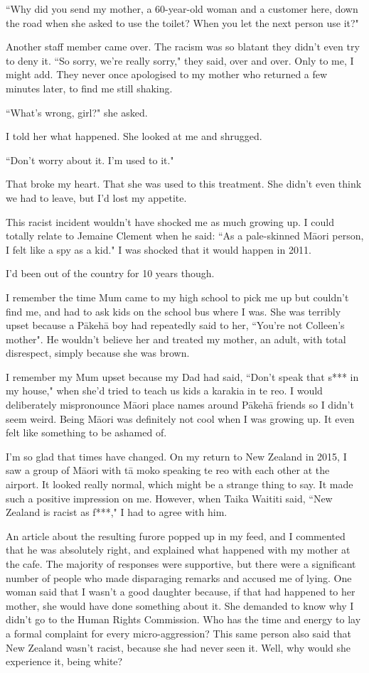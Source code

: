 \documentclass[10pt,a4paper]{article}
\newcommand{\qm}[1]{``#1"}
\begin{document}
\qm{Why did you send my mother, a 60-year-old woman and a customer here, down the road when she asked to use the toilet? When you let the next person use it?}

Another staff member came over. The racism was so blatant they didn't even try to deny it. \qm{So sorry, we're really sorry,} they said, over and over. Only to me, I might add. They never once apologised to my mother who returned a few minutes later, to find me still shaking.

\qm{What's wrong, girl?} she asked.

I told her what happened. She looked at me and shrugged.

\qm{Don't worry about it. I'm used to it.}

That broke my heart. That she was used to this treatment. She didn't even think we had to leave, but I'd lost my appetite.

This racist incident wouldn't have shocked me as much growing up. I could totally relate to Jemaine Clement when he said: \qm{As a pale-skinned Māori person, I felt like a spy as a kid.} I was shocked that it would happen in 2011.

I'd been out of the country for 10 years though.

I remember the time Mum came to my high school to pick me up but couldn't find me, and had to ask kids on the school bus where I was. She was terribly upset because a Pākehā boy had repeatedly said to her, \qm{You're not Colleen's mother}. He wouldn't believe her and treated my mother, an adult, with total disrespect, simply because she was brown.

I remember my Mum upset because my Dad had said, \qm{Don't speak that s*** in my house,} when she'd tried to teach us kids a karakia in te reo. I would deliberately mispronounce Māori place names around Pākehā friends so I didn't seem weird. Being Māori was definitely not cool when I was growing up. It even felt like something to be ashamed of.

I'm so glad that times have changed. On my return to New Zealand in 2015, I saw a group of Māori with tā moko speaking te reo with each other at the airport. It looked really normal, which might be a strange thing to say. It made such a positive impression on me. However, when Taika Waititi said, \qm{New Zealand is racist as f***,} I had to agree with him.

An article about the resulting furore popped up in my feed, and I commented that he was absolutely right, and explained what happened with my mother at the cafe. The majority of responses were supportive, but there were a significant number of people who made disparaging remarks and accused me of lying. One woman said that I wasn't a good daughter because, if that had happened to her mother, she would have done something about it. She demanded to know why I didn't go to the Human Rights Commission. Who has the time and energy to lay a formal complaint for every micro-aggression? This same person also said that New Zealand wasn't racist, because she had never seen it. Well, why would she experience it, being white?
\end{document}

